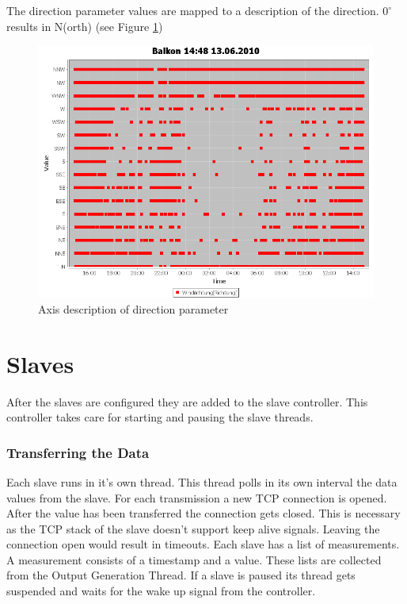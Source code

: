The direction parameter values are mapped to a description of the direction. $0^\circ$ results in N(orth) (see Figure \ref{fig:dir})

\begin{figure}[ht]
    \centering
    \includegraphics[width=0.9\linewidth]{master/plot_dir.png}
    \caption{Axis description of direction parameter}
    \label{fig:dir}
\end{figure}

\section{Slaves} %
\label{sec:slaves}

After the slaves are configured they are added to the slave controller. This controller takes care for starting and pausing the slave threads. 

\subsubsection{Transferring the Data} %
\label{ssub:getting_the_data}
Each slave runs in it's own thread. This thread polls in its own interval the data values from the slave. For each transmission a new TCP connection is opened. After the value has been transferred the connection gets closed. This is necessary as the TCP stack of the slave doesn't support keep alive signals. Leaving the connection open would result in timeouts. Each slave has a list of measurements. A measurement consists of a timestamp and a value. These lists are collected from the Output Generation Thread. If a slave is paused its thread gets suspended and waits for the wake up signal from the controller. 


